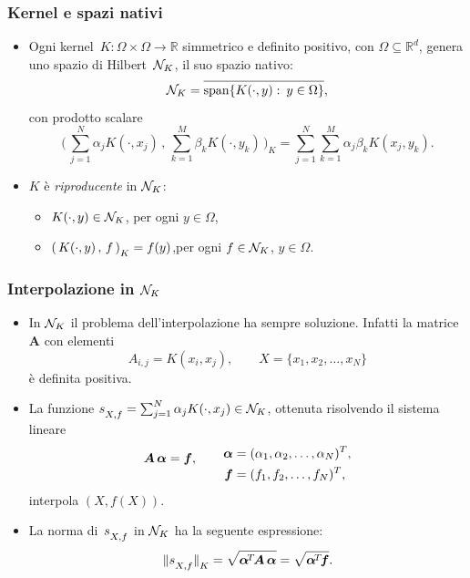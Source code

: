 \documentclass[10pt]{beamer}
\theoremstyle{definition}
\theoremstyle{plain}
\def\R{\mathbb R}
\def\Cal#1{{\cal #1}}
\def\form#1#2{(\,#1\,,\,#2\,)}
\def\Bform#1#2{\biggl(\,#1\,,\,#2\,\biggr)}
\def\norm#1{\Vert #1\Vert}
\def\hbyw#1#2{\vbox to #1{\vfil \hbox to #2{\hfil}}}
\def\hbywtop#1#2{\vtop to #1{\vfil \hbox to #2{\hfil}}}
\def\lK{{\lower.5ex\hbox{$\scriptstyle K$}}}
\def\lXf{{\lower.5ex\hbox{$\scriptstyle X, f$}}}
\begin{document}
\begin{frame}
\frametitle{Kernel e spazi nativi}
\begin{itemize}
\item
Ogni \alert{kernel}~$K:\Omega\times\Omega\to\R$ simmetrico e definito positivo, con $\Omega\subseteq\R^d$, genera uno spazio di Hilbert~$\Cal N_K$, il suo \alert{spazio nativo}:
$$
\Cal N_K = \overline{\operatorname{span}\{K(\cdot, y):\> y\in\Omega\}\hbyw{2ex}{0em}},
$$
con prodotto scalare
$$
\Bform{\sum_{j=1}^N\alpha_jK(\cdot, x_j)}{\sum_{k=1}^M\beta_k K(\cdot,y_k)}_{\!\!K} =  \sum_{j=1}^N\sum_{k=1}^M \alpha_j \beta_k K(x_j,y_k).
$$


\item
$K$ è \emph{riproducente} in $\Cal N_K$:
\begin{itemize}
\item $K(\cdot, y) \in\Cal N_K$, \quad per ogni $y\in\Omega$,
\item  $\form{K(\cdot, y)}f_{\lK} = f(y)$,\quad per ogni $f\in\Cal N_K$, $y\in\Omega$.
\end{itemize}
\end{itemize}
\end{frame}


\begin{frame}
\frametitle{Interpolazione in $\Cal N_K$}
\begin{itemize}
\item 
In $\Cal N_K$ il problema dell’interpolazione ha sempre soluzione.  Infatti la matrice $\bm A$ con elementi
$$
A_{i,j} = K(x_i, x_j), \qquad  X=\{x_1,x_2,\dots,x_N\}
$$
è definita positiva.

\item
La funzione $s_\lXf = \sum_{j=1}^N \alpha_j K(\cdot, x_j)\in\Cal N_K$, ottenuta risolvendo il sistema lineare
 $$
 \bm A\,\bm\alpha = \bm f, \qquad  \lower1ex\hbox{$\begin{aligned} 
 								\bm\alpha &= (\alpha_1,\alpha_2,\dots,\alpha_N)^T, \\
								\bm f &= (f_1,f_2,\dots,f_N)^T,
								\end{aligned}$}
$$
interpola $(X, f(X))$.
\item
La norma di~$s_\lXf$ in $\Cal N_K$ ha la seguente espressione:
$$
\norm{s_\lXf}_\lK= \sqrt{\hbywtop{.2ex}{0em}\hbyw{1.8ex}{0em}\bm\alpha^{\!T\!}\bm A\,\bm\alpha} = \sqrt{\hbywtop{.2ex}{0em}\hbyw{1.8ex}{0em}\bm\alpha^{\!T\!}\bm f}.
$$
\end{itemize}
\end{frame}
\end{document}
